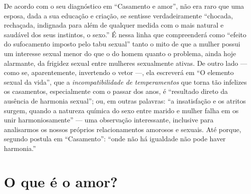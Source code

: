 De acordo com o seu diagnóstico em
``Casamento e amor'', não era raro que uma esposa, dada a sua educação e
criação, se sentisse verdadeiramente ``chocada, rechaçada, indignada
para além de qualquer medida com o mais natural e saudável dos seus
instintos, o sexo.'' É nessa linha que compreenderá como ``efeito do
sufocamento imposto pelo tabu sexual'' tanto o mito de que a mulher
possui um interesse sexual menor do que o do homem quanto o problema,
ainda hoje alarmante, da frigidez sexual entre mulheres sexualmente
ativas. De outro lado --- como se, aparentemente, invertendo o vetor ---,
ela escreverá em ``O elemento sexual da vida'', que a
\textit{incompatibilidade de temperamentos} que torna tão infelizes os
casamentos, especialmente com o passar dos anos, é ``resultado direto da
ausência de harmonia sexual''; ou, em outras palavras: ``a insatisfação
e os atritos surgem, quando a natureza química do sexo entre marido e
mulher falha em os unir harmoniosamente'' --- uma observação
interessante, inclusive para analisarmos os nossos próprios
relacionamentos amorosos e sexuais. Até porque, segundo postula em
``Casamento'': ``onde não há igualdade não pode haver harmonia.''

\section{O que é o amor?}

